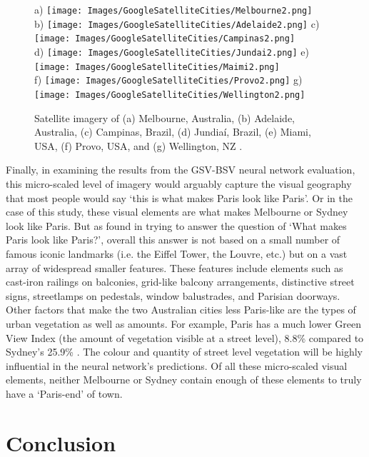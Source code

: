 \documentclass[sageh,times]{sagej}
\begin{document}
\begin{figure}[!htbp]
\centering    
a) \texttt{[image: Images/GoogleSatelliteCities/Melbourne2.png]} 
\\ b) \texttt{[image: Images/GoogleSatelliteCities/Adelaide2.png]} 
c) \texttt{[image: Images/GoogleSatelliteCities/Campinas2.png]} 
\\ d) \texttt{[image: Images/GoogleSatelliteCities/Jundai2.png]} 
e) \texttt{[image: Images/GoogleSatelliteCities/Maimi2.png]} 
\\ f) \texttt{[image: Images/GoogleSatelliteCities/Provo2.png]} 
g) \texttt{[image: Images/GoogleSatelliteCities/Wellington2.png]} 
 \caption{Satellite imagery of (a) Melbourne, Australia, (b) Adelaide, Australia, (c) Campinas, Brazil, (d) Jundia\'{i}, Brazil, (e) Miami, USA, (f) Provo, USA, and (g) Wellington, NZ \citep{GoogleStatic2017}.}    
 \label{fig:satimages}  
\end{figure} 

Finally, in examining the results from the GSV-BSV neural network evaluation, this micro-scaled level of imagery would arguably capture the visual geography that most people would say `this is what makes Paris look like Paris'. Or in the case of this study, these visual elements are what makes Melbourne or Sydney look like Paris. But as \cite{Doersch2012} found in trying to answer the question of `What makes Paris look like Paris?', overall this answer is not based on a small number of famous iconic landmarks (i.e. the Eiffel Tower, the Louvre, etc.) but on a vast array of widespread smaller features. These features include elements such as cast-iron railings on balconies, grid-like balcony arrangements, distinctive street signs, streetlamps on pedestals, window balustrades, and Parisian doorways. Other factors that make the two Australian cities less Paris-like are the types of urban vegetation as well as amounts. For example, Paris has a much lower Green View Index (the amount of vegetation visible at a street level), 8.8\% compared to Sydney's 25.9\% \citep{Li2015}. The colour and quantity of street level vegetation will be highly influential in the neural network's predictions. Of all these micro-scaled visual elements, neither Melbourne or Sydney contain enough of these elements to truly have a `Paris-end' of town.



\section{Conclusion}\label{sec:conclusion}
\end{document}
